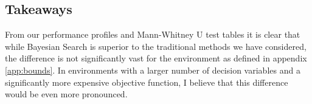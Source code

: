	\subsection{Takeaways} 
		\label{sec:comparison_takeaways} 
		From our performance profiles and Mann-Whitney U test tables it is clear that while Bayesian Search is superior to the traditional methods we have considered, the difference is not significantly vast for the environment as defined in appendix \ref{app:bounds}. In environments with a larger number of decision variables and a significantly more expensive objective function, I believe that this difference would be even more pronounced.
		
